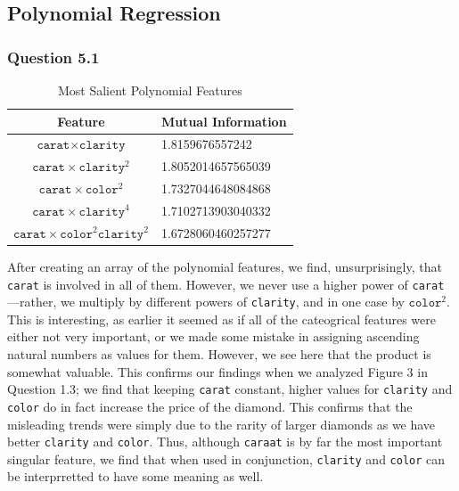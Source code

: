 \documentclass[11pt,letterpaper]{article}
\begin{document}
\subsection*{Polynomial Regression}

\subsubsection*{Question 5.1}

\begin{table}[ht]
\centering
    \label{table1} 
    \begin{tabular}{cl} 
    \hline
    \multicolumn{1}{c}{Feature} & \multicolumn{1}{c}{Mutual Information}\\
    \hline 
        $\texttt{carat} \times \texttt{clarity}$ & 1.8159676557242 \\
        $\texttt{carat} \times \texttt{clarity}^2$& 1.8052014657565039 \\
        $\texttt{carat} \times \texttt{color}^2$ & 1.7327044648084868 \\
        $\texttt{carat} \times \texttt{clarity}^4$ & 1.7102713903040332 \\
        $\texttt{carat} \times \texttt{color}^2 \texttt{clarity}^2$ & 1.6728060460257277 
    \end{tabular}
    \caption{Most Salient Polynomial Features}
    \end{table}
After creating an array of the polynomial features, we find, unsurprisingly, that \texttt{carat} is involved in all 
of them. However, we never use a higher power of \texttt{carat}—rather, we multiply by different powers of 
\texttt{clarity}, and in one case by $\texttt{color}^2$. This is interesting, as earlier it seemed as if all of the 
cateogrical features were either not very important, or we made some mistake in assigning ascending natural numbers 
as values for them. However, we see here that the product is somewhat valuable. This confirms our findings 
when we analyzed Figure 3 in Question 1.3; we find that keeping \texttt{carat} constant, 
higher values for \texttt{clarity} and \texttt{color} do in fact increase the price of the diamond. This confirms 
that the misleading trends were simply due to the rarity of larger diamonds as we have better \texttt{clarity} and 
\texttt{color}. Thus, although \texttt{caraat} is by far the most important singular feature, we find that when used 
in conjunction, \texttt{clarity} and \texttt{color} can be interprretted to have some meaning as well. \\\\
\end{document}
